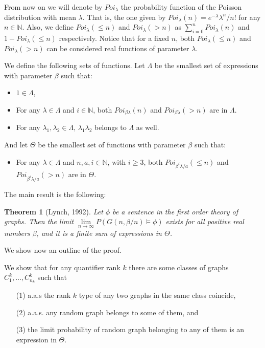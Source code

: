 \documentclass[11pt,notitlepage]{report}
\newtheorem{theorem}{Theorem}[chapter]
\theoremstyle{definition}
\newcommand{\N}{\mathbb{N}}
\begin{document}
From now on we will denote by $Poi_\lambda$ the probability
function of the Poisson distribution with mean $\lambda$.
That is, the one given by $Poi_\lambda(n)=e^{-\lambda}\lambda^n/n!$ 
for any $n\in \N$.
Also, we define $Poi_\lambda(\leq n)$ and $Poi_\lambda(>n)$ as 
$\sum_{i=0}^n Poi_\lambda(n)$ and $1-Poi_\lambda(\leq n)$
respectively. Notice that for a fixed $n$, both $Poi_\lambda(\leq n)$ 
and $Poi_\lambda(>n)$ can be considered real functions of parameter $\lambda$. \par

We define the following sets of functions. Let $\Lambda$ be the smallest 
set of expressions with parameter $\beta$ such that:

\begin{itemize}[noitemsep, topsep=0pt]
	\item $1\in \Lambda$,
	\item For any $\lambda \in \Lambda$ and $i\in \N$, 
	both $Poi_{\beta\lambda}(n)$ and $Poi_{\beta\lambda}(> n)$ are in
	$\Lambda$.
	\item For any $\lambda_1,\lambda_2 \in \Lambda$,
	$\lambda_1 \lambda_2$ belongs to $\Lambda$ as well.
\end{itemize}

And let $\Theta$ be the smallest set of functions with parameter $\beta$
such that:
\begin{itemize}[noitemsep, topsep=0pt]
	\item For any $\lambda \in \Lambda$ 
	and $n,a,i\in \N$, with $i\geq 3$, 
	both $Poi_{\beta^i\lambda/a}(\leq n)$ and $Poi_{\beta^i\lambda/a}(> n)$
	are in $\Theta$.
\end{itemize} 

The main result is the following:

\begin{theorem}[Lynch, 1992] \label{thrm:main}
	Let $\phi$ be a sentence in the first order theory of graphs. Then the limit
	$\lim\limits_{n\to \infty} P(G(n,\beta/n) \models \phi )$ exists for all positive real numbers
	$\beta$, and it is a finite sum of expressions in $\Theta$.
\end{theorem}

We show now an outline of the proof. \par 
We show that for any quantifier rank $k$ there are some classes of graphs 
$C^k_1,\dots, C^k_{n_k}$ such that
\begin{itemize}[noitemsep, topsep=0pt]
	\item[(1)] a.a.s the rank $k$ type of any two graphs in the same class coincide, 
	\item[(2)] a.a.s. any random graph belongs to some of them, and
	\item[(3)] the limit probability of random graph belonging to any of them is an expression in $\Theta$. 
\end{itemize}
\end{document}
